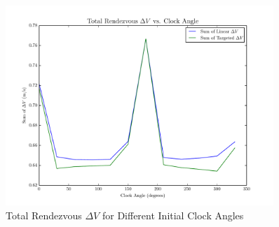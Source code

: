 \documentclass[a4paper]{article}
\begin{document}
\begin{figure}[h] 
	\begin{center}
		\includegraphics[width=0.9\textwidth]{Total_DV_2} 
		\caption{Total Rendezvous \(\Delta V\) for Different Initial Clock Angles}
		\label{fig:DV_2}
	\end{center}
\end{figure}














\clearpage



\end{document}
